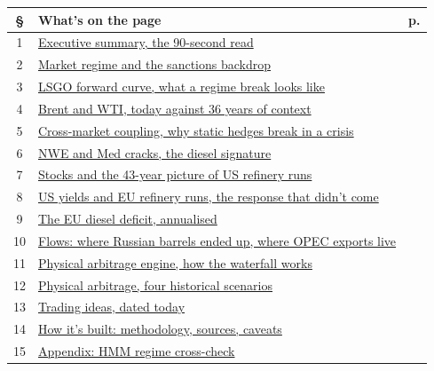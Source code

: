 \documentclass[10pt,a4paper]{article}
\begin{document}
\begin{tabularx}{\linewidth}{@{}c X r@{}}
\toprule
\textbf{\S} & \textbf{What's on the page} & \textbf{p.} \\
\midrule
1  & \hyperref[sec:1]{Executive summary, the 90-second read}                                  & \pageref{sec:1} \\
2  & \hyperref[sec:2]{Market regime and the sanctions backdrop}                               & \pageref{sec:2} \\
3  & \hyperref[sec:3]{LSGO forward curve, what a regime break looks like}                     & \pageref{sec:3} \\
4  & \hyperref[sec:4]{Brent and WTI, today against 36 years of context}                       & \pageref{sec:4} \\
5  & \hyperref[sec:5]{Cross-market coupling, why static hedges break in a crisis}             & \pageref{sec:5} \\
6  & \hyperref[sec:6]{NWE and Med cracks, the diesel signature}                               & \pageref{sec:6} \\
7  & \hyperref[sec:7]{Stocks and the 43-year picture of US refinery runs}                     & \pageref{sec:7} \\
8  & \hyperref[sec:8]{US yields and EU refinery runs, the response that didn't come}          & \pageref{sec:8} \\
9  & \hyperref[sec:9]{The EU diesel deficit, annualised}                                      & \pageref{sec:9} \\
10 & \hyperref[sec:10]{Flows: where Russian barrels ended up, where OPEC exports live}         & \pageref{sec:10} \\
11 & \hyperref[sec:11]{Physical arbitrage engine, how the waterfall works}                     & \pageref{sec:11} \\
12 & \hyperref[sec:12]{Physical arbitrage, four historical scenarios}                          & \pageref{sec:12} \\
13 & \hyperref[sec:13]{Trading ideas, dated today}                                             & \pageref{sec:13} \\
14 & \hyperref[sec:14]{How it's built: methodology, sources, caveats}                          & \pageref{sec:14} \\
15 & \hyperref[sec:15]{Appendix: HMM regime cross-check}                                        & \pageref{sec:15} \\
\bottomrule
\end{tabularx}
\end{document}
